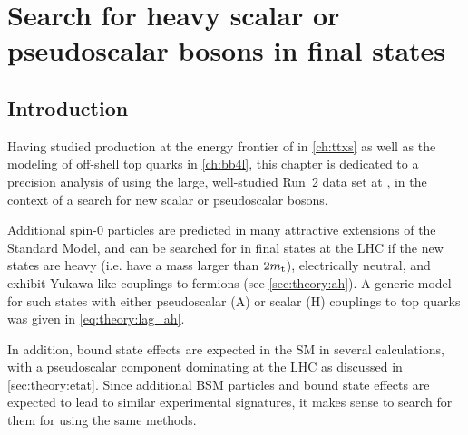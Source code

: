 \chapter{Search for heavy scalar or pseudoscalar bosons in \ttbartitle final states}
\label{ch:ah}

\section{Introduction}
\label{sec:ah:intro}

Having studied \ttbar production at the energy frontier of \sqrtsRIII in \cref{ch:ttxs} as well as the modeling of off-shell top quarks in \cref{ch:bb4l}, this chapter is dedicated to a precision analysis of \ttbar using the large, well-studied Run~2 data set at \sqrtsRII, in the context of a search for new scalar or pseudoscalar bosons.

Additional spin-0 particles are predicted in many attractive extensions of the Standard Model, and can be searched for in \ttbar final states at the LHC if the new states are heavy (i.e. have a mass larger than $2m_{\mathrm{t}}$), electrically neutral, and exhibit Yukawa-like couplings to fermions (see \cref{sec:theory:ah}). A generic model for such states with either pseudoscalar (A) or scalar (H) couplings to top quarks was given in \cref{eq:theory:lag_ah}.

In addition, \ttbar bound state effects are expected in the SM in several calculations, with a pseudoscalar component dominating at the LHC as discussed in \cref{sec:theory:etat}. 
Since additional BSM particles and bound state effects are expected to lead to similar experimental signatures, it makes sense to search for them for using the same methods.



